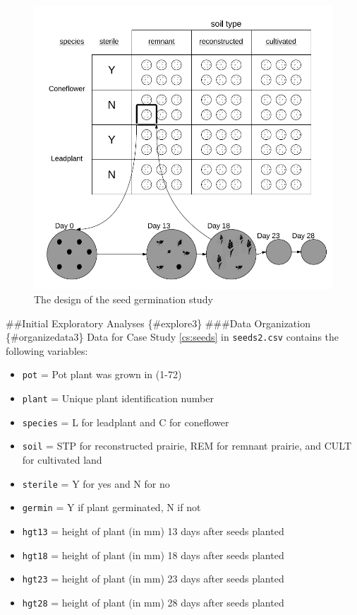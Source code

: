 \documentclass[
]{krantz}
\providecommand{\tightlist}{%
  \setlength{\itemsep}{0pt}\setlength{\parskip}{0pt}}
\begin{document}
\begin{figure}
\centering
\includegraphics{data/StudyDesignDiagram.PNG}
\caption{The design of the seed germination study}
\end{figure}

\#\#Initial Exploratory Analyses \{\#explore3\}
\#\#\#Data Organization \{\#organizedata3\}
Data for Case Study \ref{cs:seeds} in \texttt{seeds2.csv} contains the following variables:

\begin{itemize}
\tightlist
\item
  \texttt{pot} = Pot plant was grown in (1-72)
\item
  \texttt{plant} = Unique plant identification number
\item
  \texttt{species} = L for leadplant and C for coneflower
\item
  \texttt{soil} = STP for reconstructed prairie, REM for remnant prairie, and CULT for cultivated land
\item
  \texttt{sterile} = Y for yes and N for no
\item
  \texttt{germin} = Y if plant germinated, N if not
\item
  \texttt{hgt13} = height of plant (in mm) 13 days after seeds planted
\item
  \texttt{hgt18} = height of plant (in mm) 18 days after seeds planted
\item
  \texttt{hgt23} = height of plant (in mm) 23 days after seeds planted
\item
  \texttt{hgt28} = height of plant (in mm) 28 days after seeds planted
\end{itemize}
\end{document}
